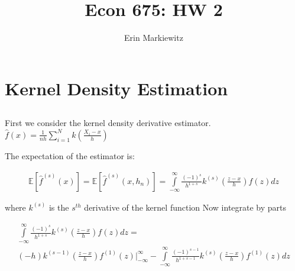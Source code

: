 \documentclass[12pt]{article}
\newcommand{\E}{\mathbb{E}}
\begin{document}





\title{Econ 675: HW 2}
\author{Erin Markiewitz}
\maketitle
\newpage
\tableofcontents
\newpage

\section{Kernel Density Estimation}
\subsection{}


First we consider the kernel density derivative estimator. $\hat{f}(x) =  \frac{1}{nh} \sum\limits_{i=1}^N k \left( \frac{X_i-x}{h} \right)$

The expectation of the estimator is:


\begin{gather*}
  \E[\hat{f}^{(s)}(x)] = \E[\hat{f}^{(s)}(x,h_n)] = \int\limits_{-\infty}^{\infty} \frac{(-1)^{s}}{h^{1+s}} k^{(s)} \left( \frac{z-x}{h} \right) f(z) dz
\end{gather*}


where $k^{(s)}$ is the $s^{th}$ derivative of the kernel function
Now integrate by parts

\begin{gather*}
\int\limits_{-\infty}^{\infty} \frac{(-1)^{s}}{h^{1+s}} k^{(s)} \left( \frac{z-x}{h} \right) f(z) dz =\\
 (-h)k^{(s-1)} \left( \frac{z-x}{h} \right)  f^{(1)}(z) |^\infty_{-\infty} - \int\limits_{-\infty}^{\infty}  \frac{(-1)^{s-1}}{h^{1+s-1}} k^{(s)} \left( \frac{z-x}{h} \right) f^{(1)}(z) dz
\end{gather*}
\end{document}
